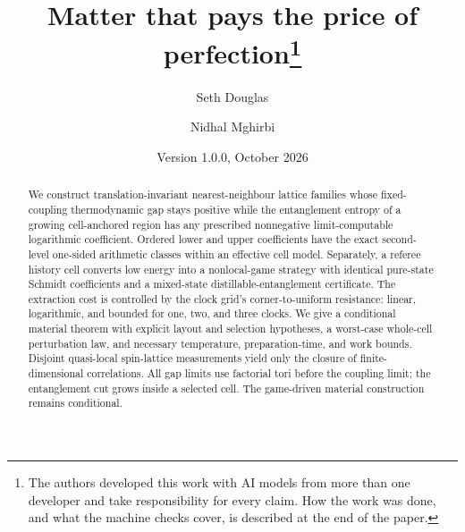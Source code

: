 \documentclass[11pt]{article}
\title{Matter that pays the price of perfection\thanks{The authors developed this work with AI models from more than one developer and take responsibility for every claim. How the work was done, and what the machine checks cover, is described at the end of the paper.}}
\author{Seth Douglas \and Nidhal Mghirbi}
\date{Version 1.0.0, October 2026}
\theoremstyle{definition}
\theoremstyle{remark}
\begin{document}
\maketitle
\begin{abstract}
We construct translation-invariant nearest-neighbour lattice families whose fixed-coupling thermodynamic gap stays positive while the entanglement entropy of a growing cell-anchored region has any prescribed nonnegative limit-computable logarithmic coefficient. Ordered lower and upper coefficients have the exact second-level one-sided arithmetic classes within an effective cell model. Separately, a referee history cell converts low energy into a nonlocal-game strategy with identical pure-state Schmidt coefficients and a mixed-state distillable-entanglement certificate. The extraction cost is controlled by the clock grid's corner-to-uniform resistance: linear, logarithmic, and bounded for one, two, and three clocks. We give a conditional material theorem with explicit layout and selection hypotheses, a worst-case whole-cell perturbation law, and necessary temperature, preparation-time, and work bounds. Disjoint quasi-local spin-lattice measurements yield only the closure of finite-dimensional correlations. All gap limits use factorial tori before the coupling limit; the entanglement cut grows inside a selected cell. The game-driven material construction remains conditional.
\end{abstract}










\begingroup
\raggedright


\endgroup
\end{document}
